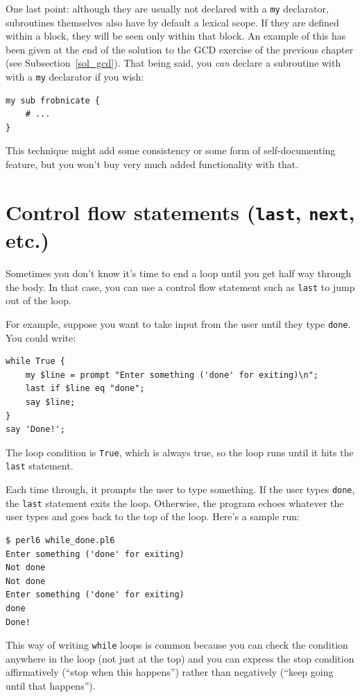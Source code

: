One last point: although they are usually not declared with 
a {\tt my} declarator, subroutines themselves also have by default
a lexical scope. If they are defined within a block, they will 
be seen only within that block. An example of this has been 
given at the end of the solution to the GCD exercise of the 
previous chapter (see Subsection~\ref{sol_gcd}). 
That being said, you \emph{can} declare a subroutine with 
with a {\tt my} declarator if you wish:

\begin{verbatim}
my sub frobnicate { 
    # ... 
}
\end{verbatim}

This technique might add some consistency or some form of 
self-documenting feature, but you won't buy very much 
added functionality with that.
 

\section{Control flow statements ({\tt last}, {\tt next}, etc.)}

Sometimes you don't know it's time to end a loop until you get half
way through the body.  In that case, you can use a control flow 
statement such as {\tt last} to jump out of the loop.

For example, suppose you want to take input from the user until they
type {\tt done}.  You could write:

\begin{verbatim}
while True {
    my $line = prompt "Enter something ('done' for exiting)\n";
    last if $line eq "done";
    say $line;
}
say 'Done!';
\end{verbatim}
%
The loop condition is {\tt True}, which is always true, so the
loop runs until it hits the {\tt last} statement.

Each time through, it prompts the user to type something.
If the user types {\tt done}, the {\tt last} statement exits
the loop.  Otherwise, the program echoes whatever the user types
and goes back to the top of the loop.  Here's a sample run:

\begin{verbatim}
$ perl6 while_done.pl6
Enter something ('done' for exiting)
Not done
Not done
Enter something ('done' for exiting)
done
Done!
\end{verbatim}
%
This way of writing {\tt while} loops is common because you
can check the condition anywhere in the loop (not just at the
top) and you can express the stop condition affirmatively
(``stop when this happens'') rather than negatively (``keep 
going until that happens'').

